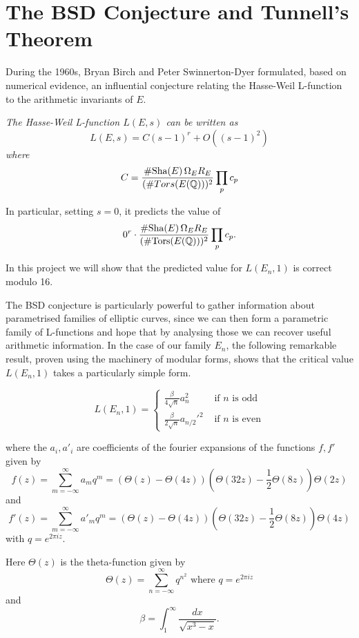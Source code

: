 \documentclass[12pt, a4paper]{report}
\begin{document}
\section{The BSD Conjecture and Tunnell's Theorem}

During the 1960s, Bryan Birch and Peter Swinnerton-Dyer formulated, based
on numerical evidence, an influential conjecture relating the Hasse-Weil
L-function to the arithmetic invariants of $E$.

\begin{conj} \normalfont
  \textit{The Hasse-Weil L-function $L(E,s)$ can be written as
  \[L(E,s) = C (s-1)^r + O((s-1)^2)\] where}
\begin{equation} \label{eq:bsd}
  C = \frac{\#\text{Sha}(E) \, \Omega_E R_E}{(\#Tors(E({\mathbb Q})))^2} \prod_p c_p
\end{equation}
\end{conj}

In particular, setting $s = 0$, it predicts the value of
\[0^r \cdot \frac{\# \text{\normalfont Sha}(E) \, \Omega_E R_E}{(\# {\text{\normalfont Tors}}(E({\mathbb Q})))^2} \prod_p c_p .\]

In this project we will show that the predicted value for $L(E_n,1)$
is correct modulo 16.

The BSD conjecture is particularly powerful to gather information about
parametrised families of elliptic curves, since we can then form a parametric
family of L-functions and hope that by analysing those we can recover useful
arithmetic information.
In the case of our family $E_n$, the following remarkable result, proven using
the machinery of modular forms, shows that the critical value
$L(E_n,1)$ takes a particularly simple form.

\begin{thm}
  \begin{equation} \label{eq:tunnell}
    L(E_n,1) = \begin{cases}
      \frac{\beta}{4\sqrt{n}}a_n^2 & \text{ if $n$ is odd} \\
      \frac{\beta}{2\sqrt{n}}a_{n/2}'^2 & \text{ if $n$ is even}
    \end{cases}
  \end{equation}

  where the $a_i, a'_i$ are coefficients of the fourier expansions of the
  functions $f, f'$ given by
  \begin{equation} \label{eq:mododd}
    f(z) = \sum\limits_{m=-\infty}^\infty a_m q^m
    = (\Theta(z) - \Theta(4z)) \left(\Theta(32z)-\frac{1}{2} \Theta(8z)\right) \Theta(2z)
  \end{equation}
  and
  \begin{equation} \label{eq:modeven}
    f'(z) = \sum\limits_{m=-\infty}^\infty a'_m q^m =
    (\Theta(z) - \Theta(4z)) \left(\Theta(32z)-\frac{1}{2} \Theta(8z)\right) \Theta(4z)
  \end{equation}
  with $q = e^{2\pi i z}$.
  
  Here $\Theta(z)$ is the theta-function given by
  \[ \Theta(z) = \sum\limits_{n = -\infty}^{\infty} q^{n^2} \text{ where } q =
    e^{2\pi iz}\]
  and
  \[\beta = \int_1^\infty \frac{dx}{\sqrt{x^3-x}}.\]
\end{thm}
\end{document}
